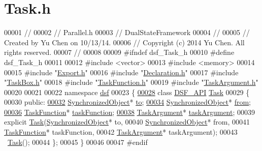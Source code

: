 \hypertarget{_task_8h_source}{}\section{Task.\+h}
\label{_task_8h_source}

\begin{DoxyCode}
00001 \textcolor{comment}{//}
00002 \textcolor{comment}{//  Parallel.h}
00003 \textcolor{comment}{//  DualStateFramework}
00004 \textcolor{comment}{//}
00005 \textcolor{comment}{//  Created by Yu Chen on 10/13/14.}
00006 \textcolor{comment}{//  Copyright (c) 2014 Yu Chen. All rights reserved.}
00007 \textcolor{comment}{//}
00008 
00009 \textcolor{preprocessor}{#ifndef dsf\_Task\_h}
00010 \textcolor{preprocessor}{#define dsf\_Task\_h}
00011 
00012 \textcolor{preprocessor}{#include <vector>}
00013 \textcolor{preprocessor}{#include <memory>}
00014 
00015 \textcolor{preprocessor}{#include "\hyperlink{dsf_2_export_8h}{Export.h}"}
00016 \textcolor{preprocessor}{#include "\hyperlink{_declaration_8h}{Declaration.h}"}
00017 \textcolor{preprocessor}{#include "\hyperlink{_task_box_8h}{TaskBox.h}"}
00018 \textcolor{preprocessor}{#include "\hyperlink{_task_function_8h}{TaskFunction.h}"}
00019 \textcolor{preprocessor}{#include "\hyperlink{_task_argument_8h}{TaskArgument.h}"}
00020 
00021 
00022 \textcolor{keyword}{namespace }\hyperlink{namespacedsf}{dsf}
00023 \{
\hypertarget{_task_8h_source_l00028}{}\hyperlink{classdsf_1_1_task}{00028}     \textcolor{keyword}{class }\hyperlink{dsf_2_export_8h_ad7bb940831423512f29a6981786c37bd}{DSF\_API} \hyperlink{classdsf_1_1_task}{Task}
00029     \{
00030     \textcolor{keyword}{public}:
\hypertarget{_task_8h_source_l00032}{}\hyperlink{classdsf_1_1_task_a36c485fbeb9c2330f5637b9d625cf01a}{00032}         \hyperlink{classdsf_1_1_synchronized_object}{SynchronizedObject}* \hyperlink{classdsf_1_1_task_a36c485fbeb9c2330f5637b9d625cf01a}{to};
\hypertarget{_task_8h_source_l00034}{}\hyperlink{classdsf_1_1_task_afc1faf30dab0d57501dfdcb4ef7b5450}{00034}         \hyperlink{classdsf_1_1_synchronized_object}{SynchronizedObject}* \hyperlink{classdsf_1_1_task_afc1faf30dab0d57501dfdcb4ef7b5450}{from};
\hypertarget{_task_8h_source_l00036}{}\hyperlink{classdsf_1_1_task_a681617cab34fbae641c5b0cf4be46659}{00036}         \hyperlink{namespacedsf_aa16e735f29587f4485b56fc46746f7a9}{TaskFunction}* \hyperlink{classdsf_1_1_task_a681617cab34fbae641c5b0cf4be46659}{taskFunction};
\hypertarget{_task_8h_source_l00038}{}\hyperlink{classdsf_1_1_task_a8a095d8a36668f6500d4df8c24dbef8d}{00038}         \hyperlink{classyc_1_1_any}{TaskArgument}* \hyperlink{classdsf_1_1_task_a8a095d8a36668f6500d4df8c24dbef8d}{taskArgument};
00039         \textcolor{keyword}{explicit} \hyperlink{namespacedsf_a7df24c7d3d82e2e686aa3a524dc1dee9}{Task}(\hyperlink{classdsf_1_1_synchronized_object}{SynchronizedObject}* to,
00040              \hyperlink{classdsf_1_1_synchronized_object}{SynchronizedObject}* from,
00041              \hyperlink{namespacedsf_aa16e735f29587f4485b56fc46746f7a9}{TaskFunction}* taskFunction,
00042              \hyperlink{classyc_1_1_any}{TaskArgument}* taskArgument);
00043         ~\hyperlink{classdsf_1_1_task}{Task}();
00044     \};
00045 \}
00046 
00047 \textcolor{preprocessor}{#endif}
\end{DoxyCode}
